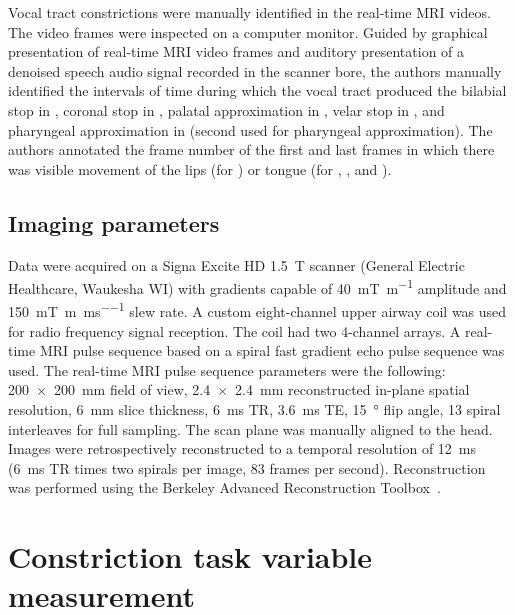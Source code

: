\documentclass[preprint]{JASAnew}\usepackage[]{graphicx}\usepackage[]{color}
\begin{document}
Vocal tract constrictions were manually identified in the real-time MRI videos. 
%
The video frames were inspected on a computer monitor. 
%
Guided by graphical presentation of real-time MRI video frames and auditory presentation of a denoised speech audio signal recorded in the scanner bore, the authors manually identified the intervals of time during which the vocal tract produced the bilabial stop in \textipa{[ApA]}, coronal stop in \textipa{[AtA]}, palatal approximation in \textipa{[AiA]}, velar stop in \textipa{[AkA]}, and pharyngeal approximation in \textipa{[AiA]} (second \textipa{[A]} used for pharyngeal approximation). 
%
The authors annotated the frame number of the first and last frames in which there was visible movement of the lips (for \textipa{[ApA]}) or tongue (for \textipa{[AtA]}, \textipa{[AkA]}, and \textipa{[AiA]}). 




\subsection{Imaging parameters}

Data were acquired on a Signa Excite HD \SI{1.5}{\tesla} scanner (General Electric Healthcare, Waukesha WI) with gradients capable of \SI[per-mode=symbol]{40}{\milli\tesla\per\meter} amplitude and \SI[per-mode=repeated-symbol]{150}{\milli\tesla\per\meter\per\milli\second} slew rate. A custom eight-channel upper airway coil was used for radio frequency signal reception. The coil had two 4-channel arrays. 
%
A real-time MRI pulse sequence based on a spiral fast gradient echo pulse sequence was used. 
%
The real-time MRI pulse sequence parameters were the following: 
%
\SI{200 x 200}{\milli\meter} field of view, 
\SI{2.4 x 2.4}{\milli\meter} reconstructed in-plane spatial resolution, 
\SI{6}{\milli\meter} slice thickness,
\SI{6}{\milli\second} TR,
\SI{3.6}{\milli\second} TE,
\SI{15}{\degree} flip angle,
\num{13} spiral interleaves for full sampling.
%
The scan plane was manually aligned to the head. 
%
Images were retrospectively reconstructed to a temporal resolution of \SI{12}{\milli\second} (\SI{6}{\milli\second} TR times two spirals per image, 83 frames per second). 
%
Reconstruction was performed using the Berkeley Advanced Reconstruction Toolbox~\cite{uecker2015berkeley}.







\section{Constriction task variable measurement}
\label{sec:cd}
\end{document}
